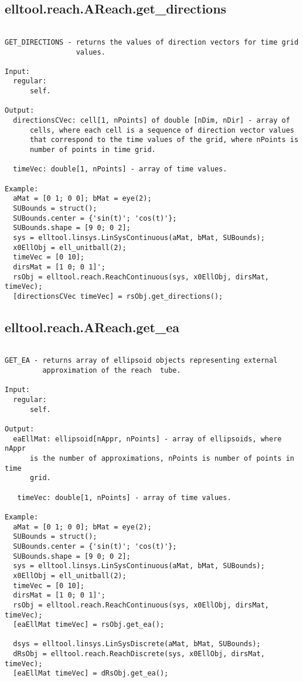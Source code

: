 \subsection{\texorpdfstring{elltool.reach.AReach.get\_directions}{get\_directions}}\label{method:elltool.reach.AReach.getdirections}
\begin{verbatim}

GET_DIRECTIONS - returns the values of direction vectors for time grid
                 values.

Input:
  regular:
      self.

Output:
  directionsCVec: cell[1, nPoints] of double [nDim, nDir] - array of
      cells, where each cell is a sequence of direction vector values
      that correspond to the time values of the grid, where nPoints is
      number of points in time grid.

  timeVec: double[1, nPoints] - array of time values.

Example:
  aMat = [0 1; 0 0]; bMat = eye(2);
  SUBounds = struct();
  SUBounds.center = {'sin(t)'; 'cos(t)'};
  SUBounds.shape = [9 0; 0 2];
  sys = elltool.linsys.LinSysContinuous(aMat, bMat, SUBounds);
  x0EllObj = ell_unitball(2);
  timeVec = [0 10];
  dirsMat = [1 0; 0 1]';
  rsObj = elltool.reach.ReachContinuous(sys, x0EllObj, dirsMat, timeVec);
  [directionsCVec timeVec] = rsObj.get_directions();
\end{verbatim}
\subsection{\texorpdfstring{elltool.reach.AReach.get\_ea}{get\_ea}}\label{method:elltool.reach.AReach.getea}
\begin{verbatim}

GET_EA - returns array of ellipsoid objects representing external
         approximation of the reach  tube.

Input:
  regular:
      self.

Output:
  eaEllMat: ellipsoid[nAppr, nPoints] - array of ellipsoids, where nAppr
      is the number of approximations, nPoints is number of points in time
      grid.

   timeVec: double[1, nPoints] - array of time values.

Example:
  aMat = [0 1; 0 0]; bMat = eye(2);
  SUBounds = struct();
  SUBounds.center = {'sin(t)'; 'cos(t)'};
  SUBounds.shape = [9 0; 0 2];
  sys = elltool.linsys.LinSysContinuous(aMat, bMat, SUBounds);
  x0EllObj = ell_unitball(2);
  timeVec = [0 10];
  dirsMat = [1 0; 0 1]';
  rsObj = elltool.reach.ReachContinuous(sys, x0EllObj, dirsMat, timeVec);
  [eaEllMat timeVec] = rsObj.get_ea();

  dsys = elltool.linsys.LinSysDiscrete(aMat, bMat, SUBounds);
  dRsObj = elltool.reach.ReachDiscrete(sys, x0EllObj, dirsMat, timeVec);
  [eaEllMat timeVec] = dRsObj.get_ea();
\end{verbatim}
